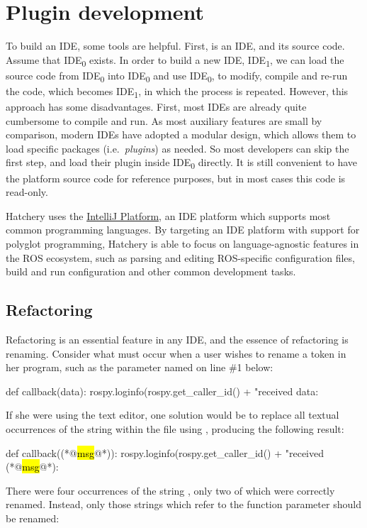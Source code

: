 \section{Plugin development}

To build an IDE, some tools are helpful. First, is an IDE, and its source code. Assume that IDE\textsubscript{0} exists. In order to build a new IDE, IDE\textsubscript{1}, we can load the source code from IDE\textsubscript{0} into IDE\textsubscript{0} and use IDE\textsubscript{0}, to modify, compile and re-run the code, which becomes IDE\textsubscript{1}, in which the process is repeated. However, this approach has some disadvantages. First, most IDEs are already quite cumbersome to compile and run. As most auxiliary features are small by comparison, modern IDEs have adopted a modular design, which allows them to load specific packages (i.e.\ \textit{plugins}) as needed. So most developers can skip the first step, and load their plugin inside IDE\textsubscript{0} directly. It is still convenient to have the platform source code for reference purposes, but in most cases this code is read-only.

Hatchery uses the \href{https://www.jetbrains.org/intellij/sdk/docs/}{IntelliJ Platform}, an IDE platform which supports most common programming languages. By targeting an IDE platform with support for polyglot programming, Hatchery is able to focus on language-agnostic features in the ROS ecosystem, such as parsing and editing ROS-specific configuration files, build and run configuration and other common development tasks.

\subsection{Refactoring}\label{subsec:refactoring}

Refactoring is an essential feature in any IDE, and the essence of refactoring is renaming. Consider what must occur when a user wishes to rename a token in her program, such as the parameter named  on line \#1 below:
%
\begin{pythonlisting}
def callback(data):
    rospy.loginfo(rospy.get_caller_id() + "received data: %
\end{pythonlisting}
%
If she were using the  text editor, one solution would be to replace all textual occurrences of the string  within the file using , producing the following result:
%
\begin{pythonlisting}
def callback((*@\hl{msg}@*)):
    rospy.loginfo(rospy.get_caller_id() + "received (*@\hl{msg}@*): %
\end{pythonlisting}
%
There were four occurrences of the string , only two of which were correctly renamed. Instead, only those strings which refer to the function parameter should be renamed:
%
\newcommand{\cfbox}[2]{\colorlet{currentcolor}{.}{\color{#1}\fbox{\color{currentcolor}#2}}}

